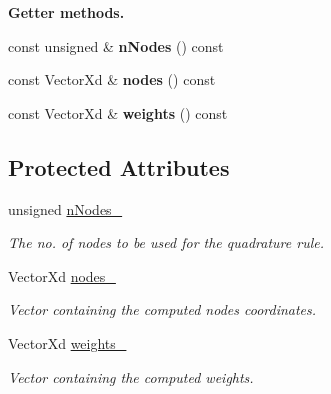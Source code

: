 \begin{Indent}{\bf Getter methods.}\par
\begin{DoxyCompactItemize}
\item 
\hypertarget{classQuadratureRule_a1fe4b7cc4dd74cd606cd56e169b20895}{const unsigned \& {\bfseries n\-Nodes} () const }\label{classQuadratureRule_a1fe4b7cc4dd74cd606cd56e169b20895}

\item 
\hypertarget{classQuadratureRule_a3e83db6b0a26aa35fa94d592c2c5426c}{const Vector\-Xd \& {\bfseries nodes} () const }\label{classQuadratureRule_a3e83db6b0a26aa35fa94d592c2c5426c}

\item 
\hypertarget{classQuadratureRule_ad03df86d720dadce277cd07fe460d8ee}{const Vector\-Xd \& {\bfseries weights} () const }\label{classQuadratureRule_ad03df86d720dadce277cd07fe460d8ee}

\end{DoxyCompactItemize}
\end{Indent}
\subsection*{Protected Attributes}
\begin{DoxyCompactItemize}
\item 
\hypertarget{classQuadratureRule_a8f4bb43717322579edc12974700aec98}{unsigned \hyperlink{classQuadratureRule_a8f4bb43717322579edc12974700aec98}{n\-Nodes\-\_\-}}\label{classQuadratureRule_a8f4bb43717322579edc12974700aec98}

\begin{DoxyCompactList}\small\item\em The no. of nodes to be used for the quadrature rule. \end{DoxyCompactList}\item 
\hypertarget{classQuadratureRule_a62ad07fa140bcc39af00e04b045dd341}{Vector\-Xd \hyperlink{classQuadratureRule_a62ad07fa140bcc39af00e04b045dd341}{nodes\-\_\-}}\label{classQuadratureRule_a62ad07fa140bcc39af00e04b045dd341}

\begin{DoxyCompactList}\small\item\em Vector containing the computed nodes coordinates. \end{DoxyCompactList}\item 
\hypertarget{classQuadratureRule_a092f514241565ee4a925e654b331dbf6}{Vector\-Xd \hyperlink{classQuadratureRule_a092f514241565ee4a925e654b331dbf6}{weights\-\_\-}}\label{classQuadratureRule_a092f514241565ee4a925e654b331dbf6}

\begin{DoxyCompactList}\small\item\em Vector containing the computed weights. \end{DoxyCompactList}\end{DoxyCompactItemize}
